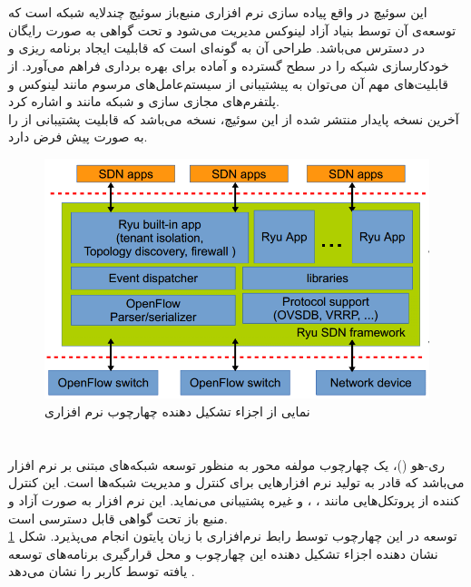 \section{}
این سوئیچ در واقع پیاده سازی نرم افزاری منبع‌باز سوئیچ چندلایه شبکه است که توسعه‌ی آن توسط بنیاد آزاد لینوکس مدیریت می‌شود و تحت گواهی  به صورت رایگان در دسترس می‌باشد. طراحی آن به گونه‌ای است که قابلیت ایجاد برنامه ریزی و خودکارسازی شبکه را در سطح گسترده و آماده برای بهره برداری فراهم می‌آورد. از قابلیت‌های مهم آن می‌توان به پیشتیبانی از سیستم‌عامل‌های مرسوم مانند لینوکس و پلتفرم‌های مجازی سازی و شبکه مانند  و  اشاره کرد.\\
آخرین نسخه پایدار منتشر شده از این سوئیچ، نسخه  می‌باشد که قابلیت پشتیبانی از  را به صورت پیش فرض دارد.

\begin{figure}
	\centering
	\includegraphics[scale=0.3]{imgs/ryu.png}
	\caption{نمایی از اجزاء تشکیل دهنده چهارچوب نرم افزاری }
	\label{fig9}
\end{figure}

\section{}
ری-هو ()، یک چهارچوب مولفه محور به منظور توسعه شبکه‌های مبتنی بر نرم افزار می‌باشد که قادر به تولید نرم افزار‌هایی برای کنترل و مدیریت شبکه‌ها است. این کنترل کننده از پروتکل‌هایی مانند ، ،  و غیره پشتیبانی می‌نماید. این نرم افزار به صورت آزاد و منبع باز تحت گواهی  قابل دسترسی است.\\
توسعه در این چهارچوب توسط رابط نرم‌افزاری با زبان پایتون انجام می‌پذیرد. شکل \ref{fig9} نشان دهنده اجزاء تشکیل دهنده این چهارچوب و محل قرارگیری برنامه‌های توسعه یافته توسط کاربر را نشان می‌دهد \cite{ryu_site}.

